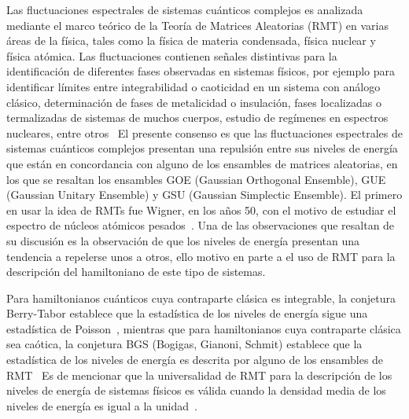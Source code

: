 \documentclass[spanish,titlepage,table]{practicas}
\begin{document}
Las fluctuaciones espectrales de sistemas cuánticos complejos es analizada mediante 
el marco teórico de la Teoría de Matrices Aleatorias (RMT) en varias áreas de la física, 
tales como la física de materia condensada, física nuclear y física atómica.
Las fluctuaciones contienen señales distintivas para la identificación de diferentes fases observadas 
en sistemas físicos, por ejemplo para identificar límites entre integrabilidad o caoticidad en un sistema con análogo clásico,
determinación de fases de metalicidad o insulación, fases localizadas o termalizadas de sistemas de muchos cuerpos, estudio de regímenes en espectros nucleares, entre otros~\cite{Tekur2020}
El presente consenso es que las fluctuaciones espectrales de sistemas cuánticos complejos presentan 
una repulsión entre sus niveles de energía que están en concordancia con alguno de los ensambles de matrices 
aleatorias, en los que se resaltan los ensambles GOE (Gaussian Orthogonal Ensemble), GUE (Gaussian Unitary Ensemble) y GSU (Gaussian Simplectic Ensemble).
El primero en usar la idea de RMTs fue Wigner, en los años 50, con el motivo de estudiar el espectro de núcleos atómicos pesados~\cite{Wigner1955}.
Una de las observaciones que resaltan de su discusión es la observación de que los niveles de energía presentan una tendencia a repelerse unos a otros, 
ello motivo en parte a el uso de RMT para la descripción del hamiltoniano de este tipo de sistemas. 

Para hamiltonianos cuánticos cuya contraparte clásica es integrable, la conjetura Berry-Tabor establece que 
la estadística de los niveles de energía sigue una estadística de Poisson~\cite{BerryTabor1977}, mientras que para hamiltonianos 
cuya contraparte clásica sea caótica, la conjetura BGS (Bogigas, Gianoni, Schmit) establece que la estadística de los niveles de energía es descrita 
por alguno de los ensambles de RMT~\cite{Atas_2013}
Es de mencionar que la universalidad de RMT para la descripción de los niveles de energía de sistemas físicos 
es válida cuando la densidad media de los niveles de energía es igual a la unidad~\cite{Atas_2013}.
\end{document}
